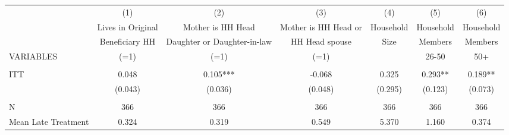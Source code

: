 \begin{tabular}{lcccccc} \hline
 & (1) & (2) & (3) & (4) & (5) & (6) \\
 & Lives in Original & Mother is HH Head & Mother is HH Head or & Household & Household & Household \\
 & Beneficiary HH & Daughter or Daughter-in-law & HH Head spouse & Size & Members & Members \\
VARIABLES & (=1) & (=1) & (=1) &  & 26-50 & 50+ \\ \hline
 &  &  &  &  &  &  \\
ITT & 0.048 & 0.105*** & -0.068 & 0.325 & 0.293** & 0.189** \\
 & (0.043) & (0.036) & (0.048) & (0.295) & (0.123) & (0.073) \\
 &  &  &  &  &  &  \\
N & 366 & 366 & 366 & 366 & 366 & 366 \\
 Mean Late Treatment & 0.324 & 0.319 & 0.549 & 5.370 & 1.160 & 0.374 \\ \hline
\end{tabular}
